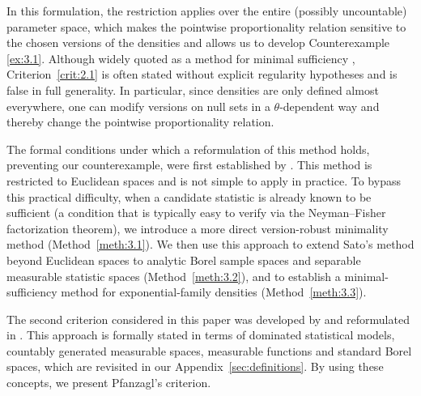 \documentclass[12pt]{article}
\begin{document}
In this formulation, the restriction applies over the entire (possibly uncountable) parameter space, which makes the pointwise proportionality relation sensitive to the chosen versions of the densities and allows us to develop Counterexample \ref{ex:3.1}. 
Although widely quoted as a method for minimal sufficiency \citep[see also][]{Young2005,Makarov2013,Olive2014,Gasperoni2025}, 
Criterion~\ref{crit:2.1} is often stated without explicit regularity hypotheses and is false in full generality. In particular, since densities are only defined almost everywhere, one can modify versions on null sets in a $\theta$-dependent way and thereby change the pointwise proportionality relation. 

The formal conditions under which a reformulation of this method holds, preventing our counterexample, were first established by \cite{Sato1996}. This method is restricted to Euclidean spaces and is not simple to apply in practice. To bypass this practical difficulty, when a candidate statistic is already known to be sufficient (a condition that is typically easy to verify via the Neyman--Fisher factorization theorem), we introduce a more direct version-robust minimality method (Method~\ref{meth:3.1}). We then use this approach to extend Sato's method beyond Euclidean spaces to analytic Borel sample spaces and separable measurable statistic spaces (Method~\ref{meth:3.2}), and to establish a minimal-sufficiency method for exponential-family densities (Method~\ref{meth:3.3}).

The second criterion considered in this paper was developed by \cite{Pfanzagl1994} and reformulated in \cite{Pfanzagl2017}. This approach is formally stated in terms of dominated statistical models, countably generated measurable spaces, measurable functions and standard Borel spaces, which are revisited in our Appendix~\ref{sec:definitions}. By using these concepts, we present Pfanzagl's criterion.  
\end{document}
